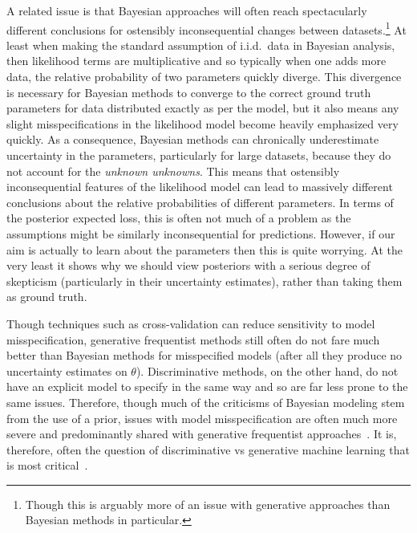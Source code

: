 A related issue is that Bayesian approaches will often reach
spectacularly different conclusions for ostensibly inconsequential changes between datasets.\footnote{Though this is arguably more
of an issue with generative approaches than Bayesian methods in particular.}
At least when making the standard assumption of i.i.d.~data in Bayesian analysis, then likelihood terms are multiplicative 
and so typically when one adds more data, the relative probability of two parameters quickly diverge.  This divergence is
necessary for Bayesian methods to converge to the correct ground truth parameters for data distributed exactly as per the
model, but it also means any slight misspecifications in the likelihood model
become heavily emphasized very quickly.  As a consequence, Bayesian methods can chronically underestimate uncertainty 
in the parameters, particularly for large datasets, because they do not account for
the \emph{unknown unknowns}.  This means that ostensibly  inconsequential features of the likelihood model
can lead to massively different conclusions about the relative probabilities of different parameters.
In terms of the posterior expected loss, this is often not much of a problem as the assumptions might be similarly
inconsequential for predictions.  However, if our aim is actually to learn 
about the parameters then this is quite worrying.  At the very least it shows why we should view posteriors with
a serious degree of skepticism (particularly in their uncertainty estimates), rather than taking them as ground truth.

Though techniques such as cross-validation can reduce sensitivity to model
misspecification, generative frequentist methods still often do not fare much better than Bayesian
methods for misspecified models (after all they produce no uncertainty estimates on $\theta$).
Discriminative methods, on the other hand, do not have
an explicit model to specify in the same way and so are far less prone to the same issues.
Therefore, though  much of the criticisms of Bayesian modeling stem
from the use of a prior, issues with model misspecification are often much more severe and predominantly
shared with generative frequentist approaches~\citep{gelman2013not}.  It is, therefore, often the question of discriminative
vs generative machine learning that is most critical~\citep{breiman2001statistical}.

